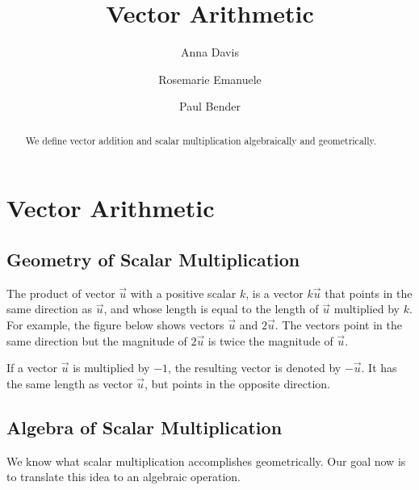 \documentclass{ximera}
\author{Anna Davis \and Rosemarie Emanuele \and Paul Bender} \title{Vector Arithmetic} \license{CC-BY 4.0}
\begin{document}
\begin{abstract}
 We define vector addition and scalar multiplication algebraically and geometrically.
\end{abstract}
\maketitle

\section*{Vector Arithmetic}

\subsection*{Geometry of Scalar Multiplication} The product of vector $\vec{u}$ with a positive scalar $k$, is a vector $k\vec{u}$ that points in the same direction as $\vec{u}$, and whose length  is equal to the length of $\vec{u}$ multiplied by $k$. For example, the figure below shows vectors $\vec{u}$ and $2\vec{u}$.  The vectors point in the same direction but the magnitude of $2\vec{u}$ is twice the magnitude of $\vec{u}$.

\begin{center}
\end{center}


If a vector $\vec{u}$ is multiplied by $-1$, the resulting vector is denoted by $-\vec{u}$.  It has the same length as vector $\vec{u}$, but points in the opposite direction.

\begin{center}
\end{center}



\subsection*{Algebra of Scalar Multiplication}
We know what scalar multiplication accomplishes geometrically.  Our goal now is to translate this idea to an algebraic operation.  
\end{document}
